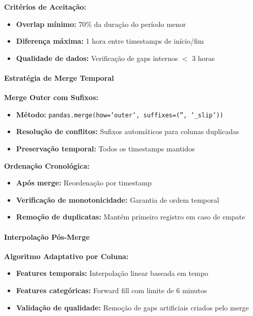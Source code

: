 \textbf{Critérios de Aceitação:}
\begin{itemize}
    \item \textbf{Overlap mínimo:} 70\% da duração do período menor
    \item \textbf{Diferença máxima:} 1 hora entre timestamps de início/fim
    \item \textbf{Qualidade de dados:} Verificação de gaps internos $<$ 3 horas
\end{itemize}

\paragraph{Estratégia de Merge Temporal}

\textbf{Merge Outer com Sufixos:}
\begin{itemize}
    \item \textbf{Método:} \texttt{pandas.merge(how='outer', suffixes=('', '\_slip'))}
    \item \textbf{Resolução de conflitos:} Sufixos automáticos para colunas duplicadas
    \item \textbf{Preservação temporal:} Todos os timestamps mantidos
\end{itemize}

\textbf{Ordenação Cronológica:}
\begin{itemize}
    \item \textbf{Após merge:} Reordenação por timestamp
    \item \textbf{Verificação de monotonicidade:} Garantia de ordem temporal
    \item \textbf{Remoção de duplicatas:} Mantém primeiro registro em caso de empate
\end{itemize}

\paragraph{Interpolação Pós-Merge}

\textbf{Algoritmo Adaptativo por Coluna:}
\begin{itemize}
    \item \textbf{Features temporais:} Interpolação linear baseada em tempo
    \item \textbf{Features categóricas:} Forward fill com limite de 6 minutos
    \item \textbf{Validação de qualidade:} Remoção de gaps artificiais criados pelo merge
\end{itemize}

